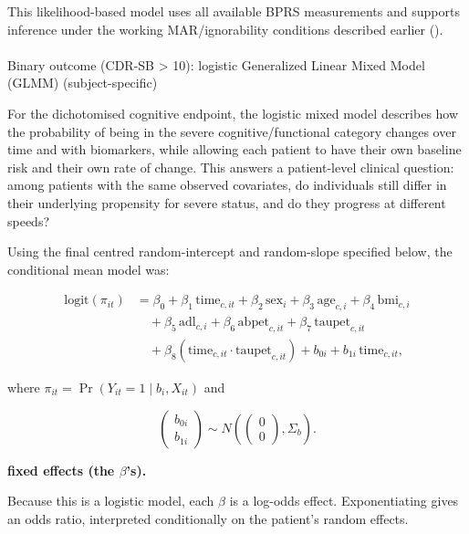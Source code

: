 \documentclass[
  9pt,
  letterpaper,
  DIV=11,
  numbers=noendperiod]{scrartcl}
\makeatletter
\let\oldparagraph\paragraph
\renewcommand{\paragraph}{
    \@ifstar
      \xxxParagraphStar
      \xxxParagraphNoStar
  }
\newcommand{\xxxParagraphStar}[1]{\oldparagraph*{#1}\mbox{}}
\newcommand{\xxxParagraphNoStar}[1]{\oldparagraph{#1}\mbox{}}
\makeatother
\begin{document}
This likelihood-based model uses all available BPRS measurements and
supports inference under the working MAR/ignorability conditions
described earlier ().

\paragraph{Binary outcome (CDR-SB \textgreater{} 10): logistic
Generalized Linear Mixed Model (GLMM)
(subject-specific)}\label{binary-outcome-cdr-sb-10-logistic-generalized-linear-mixed-model-glmm-subject-specific}

For the dichotomised cognitive endpoint, the logistic mixed model
describes how the probability of being in the severe
cognitive/functional category changes over time and with biomarkers,
while allowing each patient to have their own baseline risk and their
own rate of change. This answers a patient-level clinical question:
among patients with the same observed covariates, do individuals still
differ in their underlying propensity for severe status, and do they
progress at different speeds?

Using the final centred random-intercept and random-slope specified
below, the conditional mean model was:

\[
\begin{aligned}
\text{logit}(\pi_{it}) &= \beta_0 + \beta_1\,\mathrm{time}_{c,it} + \beta_2\,\mathrm{sex}_i + \beta_3\,\mathrm{age}_{c,i} + \beta_4\,\mathrm{bmi}_{c,i} \\
&\quad + \beta_5\,\mathrm{adl}_{c,i} + \beta_6\,\mathrm{abpet}_{c,it} + \beta_7\,\mathrm{taupet}_{c,it} \\
&\quad + \beta_8\!\left(\mathrm{time}_{c,it}\cdot \mathrm{taupet}_{c,it}\right) + b_{0i} + b_{1i}\,\mathrm{time}_{c,it},
\end{aligned}
\]

where \(\pi_{it}=\Pr(Y_{it}=1 \mid b_i, X_{it})\) and

\[
\begin{pmatrix}
b_{0i} \\
b_{1i}
\end{pmatrix}
\sim
N\!\left(
\begin{pmatrix}
0 \\
0
\end{pmatrix},
\Sigma_b
\right).
\]

\textbf{fixed effects (the \(\beta\)'s).}

Because this is a logistic model, each \(\beta\) is a log-odds effect.
Exponentiating gives an odds ratio, interpreted conditionally on the
patient's random effects.
\end{document}
